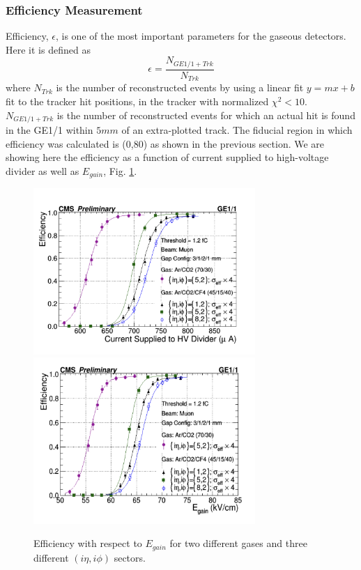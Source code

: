 \subsubsection{Efficiency Measurement}
Efficiency, $\epsilon$, is one of the most important parameters for the gaseous detectors. Here it is defined as 
\begin{equation}
\epsilon = \frac{N_{GE1/1+Trk}}{N_{Trk}}
\end{equation}
where $N_{Trk}$ is the number of reconstructed events by using a linear fit $y = mx + b$ fit to the tracker hit positions, in the tracker with normalized $\chi^2<10$.
$N_{GE1/1+Trk}$ is the number of reconstructed events for which an actual hit is found in the GE1/1 within $5mm$ of an extra-plotted track.
The fiducial region in which efficiency was calculated is (0,80) as shown in the previous section.
We are showing here the efficiency as a function of current supplied to high-voltage divider as well as $E_{gain}$, Fig. \ref{Efficiency}. 
\begin{figure}[!htbp]
\centering
\includegraphics[width=0.75\textwidth]{figures/GEM/Efficiency_Current.jpeg}\\
\includegraphics[width=0.75\textwidth]{figures/GEM/Efficiency_EGain.jpeg}
\caption{Efficiency with respect to $E_{gain}$ for two different gases and three different $(i\eta,i\phi)$ sectors.}
\label{Efficiency}
\end{figure}
